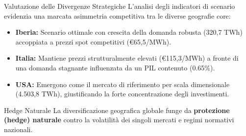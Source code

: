 \begin{frame}{Valutazione delle Divergenze Strategiche}
    L'analisi degli indicatori di scenario evidenzia una marcata asimmetria competitiva tra le diverse geografie core:
    \vspace{0.3cm}
    
    
    \begin{itemize}
        \item \textbf{Iberia:} Scenario ottimale con crescita della domanda robusta (320,7 TWh) accoppiata a prezzi spot competitivi (€65,5/MWh).
        \pause
        
        \item \textbf{Italia:} Mantiene prezzi strutturalmente elevati (€115,3/MWh) a fronte di una domanda stagnante influenzata da un PIL contenuto (0.65\%).
        \pause
        
        \item \textbf{USA:} Emergono come il mercato di riferimento per scala dimensionale (4.503,8 TWh), giustificando la forte concentrazione degli investimenti.
    \end{itemize}
    \vspace{0.2cm}
    \pause
    
    \begin{block}{Hedge Naturale}
        La diversificazione geografica globale funge da \textbf{protezione (hedge) naturale} contro la volatilità dei singoli mercati e regimi normativi nazionali.
    \end{block}
\end{frame}
